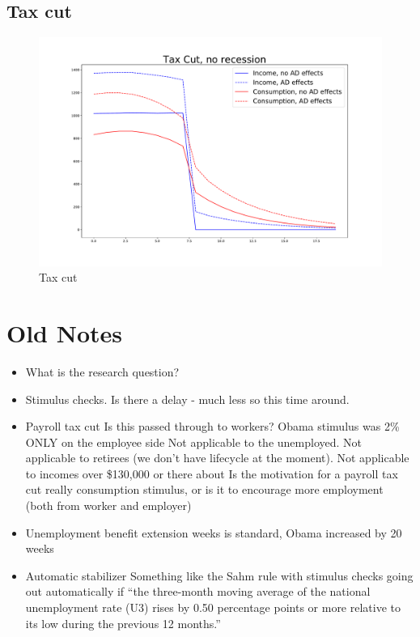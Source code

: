 \documentclass[]{article}
\begin{document}
\subsection{Tax cut}

\begin{figure} 
	\begin{centering}
		\includegraphics[width=\linewidth]{../tax_cut.pdf}
		\caption{Tax cut}
		\label{fig:taxcut}
	\end{centering}
\end{figure}



\section{Old Notes}
\begin{itemize}
	\item What is the research question?
	\item Stimulus checks. Is there a delay - much less so this time around.
	\item Payroll tax cut
	\subitem Is this passed through to workers? Obama stimulus was 2\% ONLY on the employee side
	\subitem Not applicable to the unemployed. 
	\subitem Not applicable to retirees (we don't have lifecycle at the moment).
	\subitem Not applicable to incomes over \$130,000 or there about
	\subitem Is the motivation for a payroll tax cut really consumption stimulus, or is it to encourage more employment (both from worker and employer)
	\item Unemployment benefit extension
	 weeks is standard, Obama increased by 20 weeks
	\item Automatic stabilizer
	\subitem Something like the Sahm rule with stimulus checks going out automatically if ``the three-month moving average of the national unemployment rate (U3) rises by 0.50 percentage points or more relative to its low during the previous 12 months.''
\end{itemize}
\end{document}
